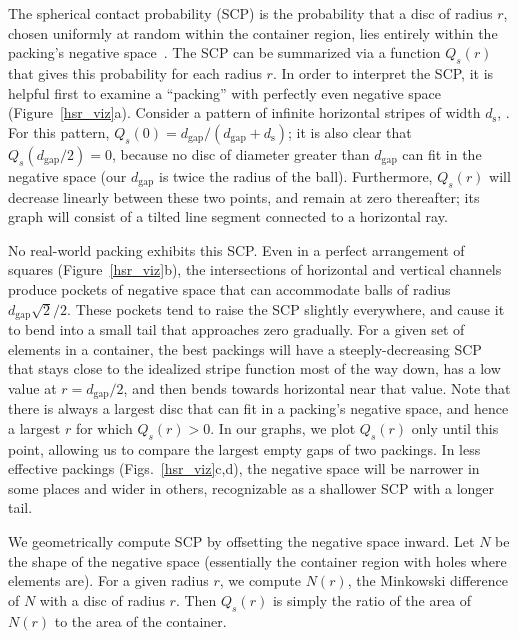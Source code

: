 The spherical contact probability (SCP) is the probability that a 
disc of radius $r$, chosen
uniformly at random within the container region, lies entirely within the 
packing's negative space~\cite{Chiu2013}.
The SCP can be summarized via a function $Q_s(r)$ that gives this 
probability for each radius $r$.
In order to interpret the SCP, it is helpful first to
examine a ``packing'' with perfectly even negative space (Figure~\ref{hsr_viz}a).
Consider a pattern of infinite horizontal stripes of width $d_\mathrm{s}$,
.  For this pattern,
$Q_s(0)=d_\mathrm{gap}/(d_\mathrm{gap}+d_\mathrm{s})$; it is also
clear that $Q_s(d_\mathrm{gap}/2)=0$, because no disc of diameter greater
than $d_\mathrm{gap}$ can fit in the negative space
(our $d_\mathrm{gap}$ is twice the radius of the ball).
Furthermore,
$Q_s(r)$ will decrease linearly between these two points, and remain
at zero thereafter; its graph will consist of a tilted line segment
connected to a horizontal ray.




No real-world packing exhibits this SCP.  Even in a perfect arrangement
of squares (Figure~\ref{hsr_viz}b), the intersections of horizontal and
vertical channels
produce pockets of negative space that can accommodate balls of
radius $d_\mathrm{gap}\sqrt{2}/2$.  These pockets tend to raise the SCP
slightly everywhere, and cause it to bend into a small tail that
approaches zero gradually.
For a given set of elements in a container, the best packings will
have a steeply-decreasing SCP that stays close to the idealized stripe function most
of the way down, has a low value at $r=d_\mathrm{gap}/2$,
and then bends towards horizontal near that value.
Note that there is always a largest disc that can fit in a packing's
negative space, and hence a largest $r$ for which $Q_s(r)>0$.  
In our graphs, we plot $Q_s(r)$ only until this point, allowing us
to compare the largest empty gaps of two packings.
In less effective packings (Figs.~\ref{hsr_viz}c,d), the negative space 
will be narrower in
some places and wider in others, recognizable as a shallower SCP
with a longer tail.

We geometrically compute SCP by offsetting the negative
space inward.  Let $N$ be the shape of the negative space (essentially
the container region with holes where elements are).  For a given radius
$r$, we compute $N(r)$, the Minkowski difference of $N$ with a disc of
radius $r$.  Then $Q_s(r)$ is simply the ratio of the area of $N(r)$ to
the area of the container.

